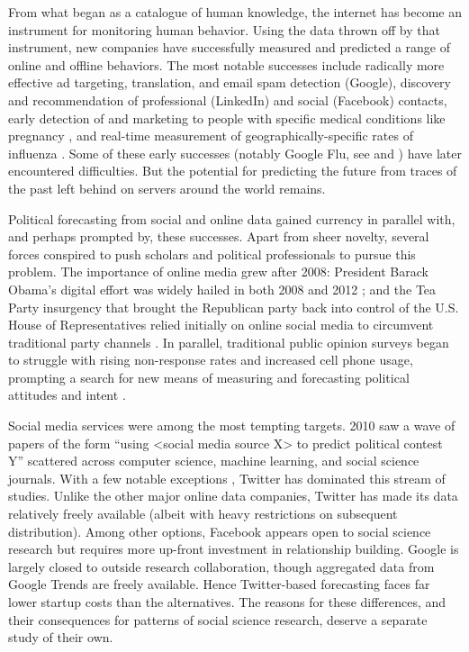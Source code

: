 \documentclass{article}
\begin{document}

From what began as a catalogue of human knowledge, the internet has
become an instrument for monitoring human behavior. Using the data
thrown off by that instrument, new companies have successfully
measured and predicted a range of online and offline behaviors. The
most notable successes include radically more effective ad targeting,
translation, 
and email spam detection
(Google), discovery and recommendation of professional (LinkedIn) and
social (Facebook) contacts, early detection of and marketing to people
with specific medical conditions like pregnancy \citep{hill2012},
and real-time measurement of geographically-specific rates of influenza
\citep{ginsberg2008detecting}. Some of these early successes (notably Google
Flu, see \cite{butler2013google} and \cite{41763}) have later encountered
difficulties. But the potential for predicting the future from 
traces of the past left behind on servers around the world remains.

Political forecasting from social and online data gained currency in
parallel with, and perhaps prompted by, these successes. Apart from
sheer novelty, several forces conspired to push scholars and political
professionals to pursue this problem. The importance of online media grew after
2008: President Barack Obama's digital effort was widely hailed in
both 2008 and 2012
\citep{smith2009internet,levenshus2010online,wallsten2010yes,scherer2012}; and the
Tea Party insurgency that brought the Republican party back into
control of the U.S. House of Representatives relied initially on
online social media to circumvent traditional party channels
\citep{williamson2011tea}. In parallel, traditional public opinion
surveys began to struggle with rising non-response rates and increased
cell phone usage, prompting a search for new means of measuring and
forecasting political attitudes and intent
\citep{keeter2006gauging,christian2010assessing,kohut2012assessing,boyle2013sampling,viera2013mail}.

Social media services were among the most tempting
targets. 2010 saw a wave of papers of the form ``using
<social media source X> to predict political contest Y'' scattered across computer science, machine learning, and
social science journals. With a few notable exceptions
\citep{bond201261,broockman2013online}, Twitter has dominated this
stream of studies. Unlike the other major online data companies, Twitter has made
its data relatively freely available (albeit with heavy restrictions
on subsequent distribution). Among other options, Facebook appears open to
social science research but requires more up-front investment in
relationship building. Google is largely closed to outside research collaboration, though aggregated
data from Google Trends are freely available. Hence Twitter-based
forecasting faces far lower startup costs than the alternatives. The reasons for these
differences, and their consequences for patterns of social science
research, deserve a separate study of their own.
\end{document}
